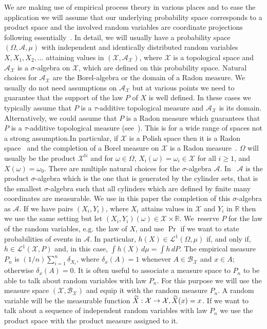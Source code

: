 \documentclass[AHL,Unicode,longabstracts,published]{cedram}
\theoremstyle{remark}
\newcommand{\R}{\mathbb{R}}
\newcommand{\bbN}{\mathbb{N}}
\newcommand{\X}{\mathcal{X}}
\newcommand{\clB}{\mathcal{B}}
\newcommand{\clA}{\mathcal{A}}
\newcommand{\clL}{\mathcal{L}}
\newcommand*{\MK}{\mkern 2mu}
\let\oldtilde\tilde
\renewcommand*{\tilde}[1]{\mathchoice{\widetilde{#1}}{\widetilde{#1}}{\oldtilde{#1}}{\oldtilde{#1}}}
\renewcommand*{\to}{\mathchoice{\longrightarrow}{\rightarrow}{\rightarrow}{\rightarrow}}
\begin{document}
We are making use of empirical process theory in various places and to ease the application we will assume that our underlying probability space corresponds to a product space and the involved random variables are coordinate projections following essentially~\cite[Section~3.1]{DUDLEY14}. In detail, we will usually have a probability space $(\Omega,\clA,\mu)$ with independent and identically distributed random variables $X,X_1,X_2,\dots $ attaining values in $(\X,\clA_\X)$, where $\X$ is a topological space and $\clA_\X$ is a $\sigma$-algebra on $\X$, which are defined on this probability space. Natural choices for $\clA_\X$ are the Borel-algebra or the domain of a Radon measure. We usually do not need assumptions on $\clA_\X$ but at various points we need to guarantee that the support of the law $P$ of $X$ is well defined. In these cases we typically assume that $P$ is a $\tau$-additive topological measure and $\clA_\X$ is its domain. Alternatively, we could assume that $P$ is a Radon measure which guarantees that $P$ is a $\tau$-additive topological measure (see~\cite[411]{FREM}). This is for a wide range of spaces not a strong assumption.\linebreak In particular, if $\X$ is a Polish space then it is a Radon space~\cite[434K$\MK$(b)]{FREM} and the completion of a Borel measure on $\X$ is a Radon measure~\cite[434F$\MK$(a.iii), 211L]{FREM}. $\Omega$ will usually be the product $\X^\bbN$ and for $\omega \in \Omega$, $X_i(\omega) = \omega_i \in \X$ for all $i \geq 1$, and $X(\omega) = \omega_0$. There are multiple natural choices for the $\sigma$-algebra $\clA$. In~\cite[Section~3.1]{DUDLEY14} $\clA$ is the product $\sigma$-algebra which is the one that is generated by the cylinder sets, that is the smallest $\sigma$-algebra such that all cylinders which are defined by finite many coordinates are measurable. We use in this paper the completion of this $\sigma$-algebra as $\clA$. If we have pairs $(X_i,Y_i)$, where $X_i$ attains values in $\X$ and $Y_i$ in $\R$ then we use the same setting but let $(X_i,Y_i)(\omega) \in \X \times \R$. We~reserve $P$ for the law of the random variables, e.g. the law of $X$, and use $\Pr$ if we want to state probabilities of events in $\clA$. In particular, $h(X) \in \clL^1(\Omega,\mu)$ if, and only if, $h \in \clL^1(\X, P)$ and, in this case, $\int h(X) \, d\mu = \int h \,d P$. The empirical measure $P_n$ is $(1/n) \sum_{i=1}^n \delta_{X_i}$, where $\delta_x(A) = 1$ whenever $A \in \clB_\X$ and $x \in A$; otherwise $\delta_x(A) = 0$. It is often useful to associate a measure space to $P_n$ to be able to talk about random variables with law $P_n$. For this purpose we will use the measure space $(\X,\clB_\X)$ and equip it with the random measure $P_n$. A random variable will be the measurable function $\tilde X:\X \to \X, \tilde X(x) = x$. If we want to talk about a sequence of independent random variables with law $P_n$ we use the product space with the product measure assigned to it.
\end{document}

